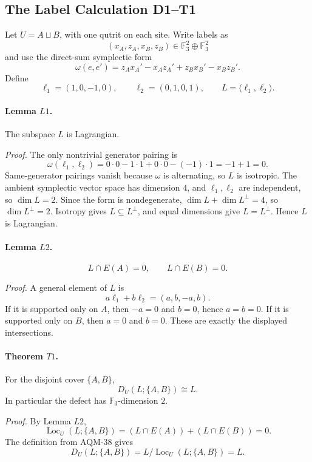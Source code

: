 \subsection{The Label Calculation D1--T1}

Let \(U=A\sqcup B\), with one qutrit on each site.  Write labels as
\[
  (x_A,z_A,x_B,z_B)\in
  \mathbb F_3^2\oplus\mathbb F_3^2
\]
and use the direct-sum symplectic form
\[
  \omega(e,e')=
  z_Ax_A'-x_Az_A' + z_Bx_B'-x_Bz_B' .
\]
Define
\[
  \ell_1=(1,0,-1,0),\qquad
  \ell_2=(0,1,0,1),
  \qquad
  L=\langle \ell_1,\ell_2\rangle .
\]

\paragraph{Lemma \(L1\).}
The subspace \(L\) is Lagrangian.

\emph{Proof.}
The only nontrivial generator pairing is
\[
  \omega(\ell_1,\ell_2)
  =
  0\cdot0-1\cdot1+0\cdot0-(-1)\cdot1
  =
  -1+1=0 .
\]
Same-generator pairings vanish because \(\omega\) is alternating, so \(L\) is
isotropic.  The ambient symplectic vector space has dimension \(4\), and
\(\ell_1,\ell_2\) are independent, so \(\dim L=2\).  Since the form is
nondegenerate, \(\dim L+\dim L^\perp=4\), so \(\dim L^\perp=2\).  Isotropy
gives \(L\subseteq L^\perp\), and equal dimensions give \(L=L^\perp\).  Hence
\(L\) is Lagrangian.

\paragraph{Lemma \(L2\).}
\[
  L\cap E(A)=0,\qquad L\cap E(B)=0.
\]

\emph{Proof.}
A general element of \(L\) is
\[
  a\ell_1+b\ell_2=(a,b,-a,b).
\]
If it is supported only on \(A\), then \(-a=0\) and \(b=0\), hence
\(a=b=0\).  If it is supported only on \(B\), then \(a=0\) and \(b=0\).  These
are exactly the displayed intersections.

\paragraph{Theorem \(T1\).}
For the disjoint cover \(\{A,B\}\),
\[
  D_U(L;\{A,B\})\cong L.
\]
In particular the defect has \(\mathbb F_3\)-dimension \(2\).

\emph{Proof.}
By Lemma \(L2\),
\[
  \operatorname{Loc}_U(L;\{A,B\})
  =
  (L\cap E(A))+(L\cap E(B))=0.
\]
The definition from AQM-38 gives
\[
  D_U(L;\{A,B\})
  =
  L/\operatorname{Loc}_U(L;\{A,B\})
  =
  L.
\]

